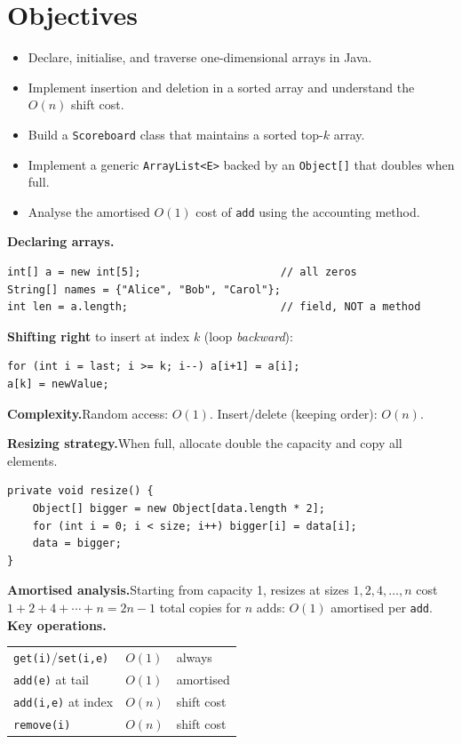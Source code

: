 \documentclass[11pt]{article}
\begin{document}
\labheader

\section*{Objectives}
\begin{itemize}[leftmargin=*,nosep]
  \item Declare, initialise, and traverse one-dimensional arrays in Java.
  \item Implement insertion and deletion in a sorted array and understand the $O(n)$ shift cost.
  \item Build a \texttt{Scoreboard} class that maintains a sorted top-$k$ array.
  \item Implement a generic \texttt{ArrayList<E>} backed by an \texttt{Object[]} that doubles when full.
  \item Analyse the amortised $O(1)$ cost of \texttt{add} using the accounting method.
\end{itemize}

\begin{summary}
\textbf{Declaring arrays.}
\begin{lstlisting}
int[] a = new int[5];                      // all zeros
String[] names = {"Alice", "Bob", "Carol"};
int len = a.length;                        // field, NOT a method
\end{lstlisting}
\textbf{Shifting right} to insert at index $k$ (loop \emph{backward}):
\begin{lstlisting}
for (int i = last; i >= k; i--) a[i+1] = a[i];
a[k] = newValue;
\end{lstlisting}
\textbf{Complexity.}\quad Random access: $O(1)$. Insert/delete (keeping order): $O(n)$.
\end{summary}

\begin{summary}
\textbf{Resizing strategy.}\quad When full, allocate double the capacity and copy all elements.
\begin{lstlisting}
private void resize() {
    Object[] bigger = new Object[data.length * 2];
    for (int i = 0; i < size; i++) bigger[i] = data[i];
    data = bigger;
}
\end{lstlisting}
\textbf{Amortised analysis.}\quad Starting from capacity 1, resizes at sizes $1,2,4,\ldots,n$
cost $1+2+4+\cdots+n = 2n-1$ total copies for $n$ adds: $O(1)$ amortised per \texttt{add}.\\
\textbf{Key operations.}
\begin{tabular}{@{}lll@{}}
\toprule
\texttt{get(i)}/\texttt{set(i,e)} & $O(1)$ & always \\
\texttt{add(e)} at tail & $O(1)$ & amortised \\
\texttt{add(i,e)} at index & $O(n)$ & shift cost \\
\texttt{remove(i)} & $O(n)$ & shift cost \\
\bottomrule
\end{tabular}
\end{summary}
\end{document}
